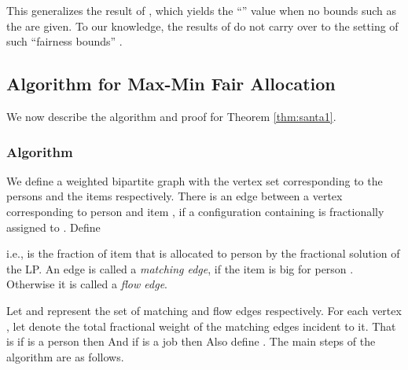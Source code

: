 This generalizes the result of \cite{dani:05}, which yields the
``'' value when no bounds such as the  are given.
To our knowledge, the results of
\cite{julia:focs09,asadpour:stoc07,asadpour-feige-saberi,bansal:stoc06}
do not carry over to the setting of such ``fairness bounds'' .

\subsection{Algorithm for Max-Min Fair Allocation}
\label{subsec:algo}

We now describe the algorithm and proof for Theorem \ref{thm:santa1}.

\subsubsection{Algorithm}

We define a weighted bipartite graph  with the vertex set  corresponding to the persons and the items respectively. There is an edge between a vertex corresponding to person  and item , if a configuration  containing  is fractionally assigned to . Define

i.e.,  is the
fraction of item  that is allocated to person  by the fractional solution of the LP. An edge  is called a {\em matching edge}, if the item  is big for person . Otherwise it is called a {\em flow edge}.





Let  and  represent the set of matching and flow edges respectively. For each vertex , let  denote the total fractional weight of the matching edges incident to it. That is if  is a person then  And if  is a job then   Also define . The main steps of the algorithm are as follows.

\bigskip


